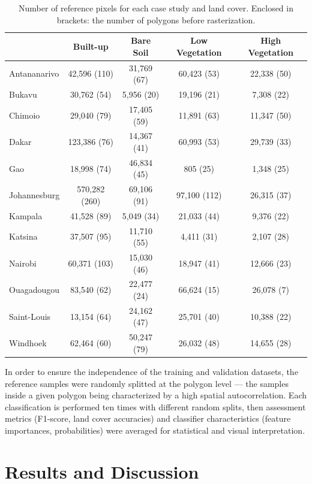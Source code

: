 \documentclass[remotesensing,article,submit,moreauthors,pdftex,10pt,a4paper]{Definitions/mdpi}
\begin{document}
\begin{table}[H]
    \caption{Number of reference pixels for each case study and land cover.
    Enclosed in brackets: the number of polygons before rasterization.}
    \centering
    \label{tbl:reference-count}
    \begin{tabular}{lcccc}
        \toprule
        & \textbf{Built-up} & \textbf{Bare Soil} & \textbf{Low Vegetation} & \textbf{High Vegetation} \\
        \midrule
        Antananarivo & 42,596 (110) & 31,769 (67) & 60,423 (53) & 22,338 (50) \\
        Bukavu & 30,762 (54) & 5,956 (20) & 19,196 (21) & 7,308 (22) \\
        Chimoio & 29,040 (79) & 17,405 (59) & 11,891 (63) & 11,347 (50) \\
        Dakar & 123,386 (76) & 14,367 (41) & 60,993 (53) & 29,739 (33) \\
        Gao & 18,998 (74) & 46,834 (45) & 805 (25) & 1,348 (25) \\
        Johannesburg & 570,282 (260) & 69,106 (91) & 97,100 (112) & 26,315 (37) \\
        Kampala & 41,528 (89) & 5,049 (34) & 21,033 (44) & 9,376 (22) \\
        Katsina & 37,507 (95) & 11,710 (55) & 4,411 (31) & 2,107 (28) \\
        Nairobi & 60,371 (103) & 15,030 (46) & 18,947 (41) & 12,666 (23) \\
        Ouagadougou & 83,540 (62) & 22,477 (24) & 66,624 (15) & 26,078 (7) \\
        Saint-Louis & 13,154 (64) & 24,162 (47) & 25,701 (40) & 10,388 (22) \\
        Windhoek & 62,464 (60) & 50,247 (79) & 26,032 (48) & 14,655 (28) \\
        \bottomrule
    \end{tabular}
\end{table}

In order to ensure the independence of the training and validation datasets, the
reference samples were randomly splitted at the polygon level --- the samples
inside a given polygon being characterized by a high spatial autocorrelation.
Each classification is performed ten times with different random splits, then
assessment metrics (F1-score, land cover accuracies) and classifier
characteristics (feature importances, probabilities) were averaged for
statistical and visual interpretation.

\section{Results and Discussion}
\end{document}

